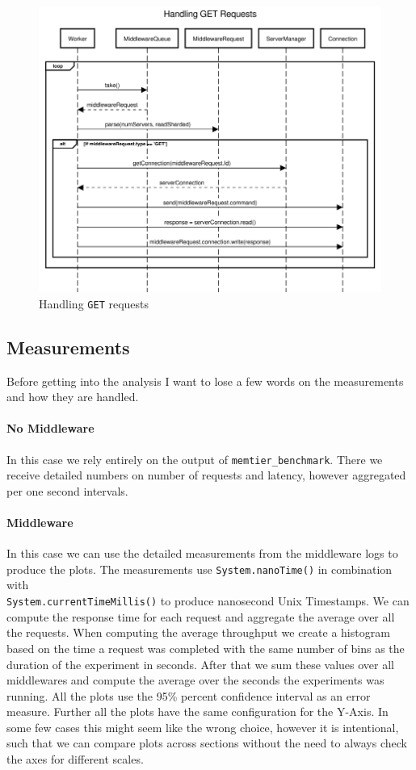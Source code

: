 \documentclass[11pt,a4paper]{article}
\begin{document}
%
\begin{figure}[H]
    \includegraphics[width=\linewidth]{../illustrations/handling_get.png}
    \caption{Handling \texttt{GET} requests}
    \label{fig:handling_get}
\end{figure}
%
\subsection{Measurements}
%
Before getting into the analysis I want to lose a few words on the measurements and how they are handled.
%
\paragraph{No Middleware}
%
In this case we rely entirely on the output of \texttt{memtier\_benchmark}.
%
There we receive detailed numbers on number of requests and latency, however aggregated per one second intervals.
%
\paragraph{Middleware}
%
In this case we can use the detailed measurements from the middleware logs to produce the plots.
%
The measurements use \texttt{System.nanoTime()} in combination with \\ \texttt{System.currentTimeMillis()} to produce nanosecond Unix Timestamps.
%
We can compute the response time for each request and aggregate the average over all the requests.
%
When computing the average throughput we create a histogram based on the time a request was completed with the same number of bins as the duration of the experiment in seconds.
%
After that we sum these values over all middlewares and compute the average over the seconds the experiments was running.
%
All the plots use the 95\% percent confidence interval as an error measure.
%
Further all the plots have the same configuration for the Y-Axis.
%
In some few cases this might seem like the wrong choice, however it is intentional, such that we can compare plots across sections without the need to always check the axes for different scales.
%
\end{document}
